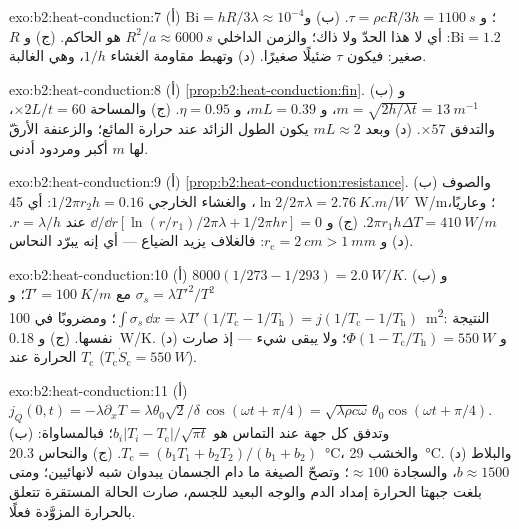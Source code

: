 \begin{solution}{exo:b2:heat-conduction:7}
(أ) $\mathrm{Bi} = hR/3\lambda \approx 10^{-4}$؛ و $\tau = \rho cR/3h = \qty{1100}{s}$.
(ب) و $\mathrm{Bi} = 1.2$: أي لا هذا الحدّ ولا ذاك؛ والزمن الداخلي $R^2/a \approx
\qty{6000}{s}$ هو الحاكم. (ج) و $R$ صغير: فيكون $\tau$ ضئيلًا  صغيرًا.
(د) وتهبط مقاومة الغشاء $1/h$، وهي الغالبة.
\end{solution}

\begin{solution}{exo:b2:heat-conduction:8}
(أ) \cref{prop:b2:heat-conduction:fin}. (ب) و $m = \sqrt{2h/\lambda t} =
\qty{13}{m^{-1}}$، و $mL = 0.39$، و $\eta = 0.95$. (ج) والمساحة $\times 2L/t = 60$، والتدفق
$\times 57$. (د) وبعد $mL \approx 2$ يكون الطول الزائد عند حرارة
المائع؛ والزعنفة الأرقّ لها $m$ أكبر ومردود أدنى.
\end{solution}

\begin{solution}{exo:b2:heat-conduction:9}
(أ) \cref{prop:b2:heat-conduction:resistance}. (ب) والصوف $\ln 2/2\pi\lambda =
\qty{2.76}{K.m/W}$، والغشاء الخارجي $1/2\pi r_2h = 0.16$: أي \qty{45}{W/m}؛ وعاريًا،
$2\pi r_1h\Delta T = \qty{410}{W/m}$. (ج) و $\dd/\dd r[\ln(r/r_1)/2\pi\lambda + 1/2\pi hr]
= 0$ عند $r = \lambda/h$. (د) و $r_{\text{c}} = \qty{2}{cm} > \qty{1}{mm}$: فالغلاف
يزيد الضياع --- أي إنه يبرّد النحاس.
\end{solution}

\begin{solution}{exo:b2:heat-conduction:10}
(أ) $8000(1/273 - 1/293) = \qty{2.0}{W/K}$. (ب) و $\sigma_s = \lambda T'^2/T^2$ مع
$T' = \qty{100}{K/m}$؛ و $\int\sigma_s\,\dd x = \lambda T'(1/T_{\text{c}} - 1/T_{\text{h}})
= j(1/T_{\text{c}} - 1/T_{\text{h}})$؛ ومضروبًا في \qty{100}{m^2}: النتيجة نفسها. (ج)
و \qty{0.18}{W/K}. (د) و $\Phi(1 - T_{\text{c}}/T_{\text{h}}) = \qty{550}{W}$؛ ولا يبقى شيء
--- إذ صارت الحرارة عند $T_{\text{c}}$ ($T_{\text{c}}\dot S_{\text{c}} = \qty{550}{W}$).
\end{solution}

\begin{solution}{exo:b2:heat-conduction:11}
(أ) $j_Q(0,t) = -\lambda\partial_xT = \lambda\theta_0\sqrt2/\delta\,\cos(\omega t +
\pi/4) = \sqrt{\lambda\rho c\omega}\,\theta_0\cos(\omega t + \pi/4)$. (ب) وتدفق كل
جهة عند التماس هو $b_i|T_i - T_{\text{c}}|/\sqrt{\pi t}$؛ فبالمساواة:
$T_{\text{c}} = (b_1T_1 + b_2T_2)/(b_1 + b_2)$. (ج) والنحاس \qty{20.3}{\celsius}،
والخشب \qty{29}{\celsius}. (د) والبلاط $b \approx 1500$، والسجادة $\approx 100$؛ وتصحّ
الصيغة ما دام الجسمان يبدوان شبه لانهائيين؛ ومتى بلغت جبهتا
الحرارة إمداد الدم والوجه البعيد للجسم، صارت الحالة
المستقرة تتعلق بالحرارة المزوَّدة فعلًا.
\end{solution}

